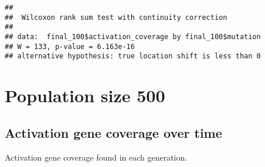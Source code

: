 \documentclass[
]{book}
\newenvironment{Shaded}{\begin{snugshade}}{\end{snugshade}}
\newcommand{\AttributeTok}[1]{\textcolor[rgb]{0.13,0.29,0.53}{#1}}
\newcommand{\ConstantTok}[1]{\textcolor[rgb]{0.56,0.35,0.01}{#1}}
\newcommand{\DecValTok}[1]{\textcolor[rgb]{0.00,0.00,0.81}{#1}}
\newcommand{\FloatTok}[1]{\textcolor[rgb]{0.00,0.00,0.81}{#1}}
\newcommand{\FunctionTok}[1]{\textcolor[rgb]{0.13,0.29,0.53}{\textbf{#1}}}
\newcommand{\NormalTok}[1]{#1}
\newcommand{\OtherTok}[1]{\textcolor[rgb]{0.56,0.35,0.01}{#1}}
\newcommand{\SpecialCharTok}[1]{\textcolor[rgb]{0.81,0.36,0.00}{\textbf{#1}}}
\newcommand{\StringTok}[1]{\textcolor[rgb]{0.31,0.60,0.02}{#1}}
\begin{document}
\begin{Shaded}
\end{Shaded}

\begin{verbatim}
## 
##  Wilcoxon rank sum test with continuity correction
## 
## data:  final_100$activation_coverage by final_100$mutation
## W = 133, p-value = 6.163e-16
## alternative hypothesis: true location shift is less than 0
\end{verbatim}

\hypertarget{population-size-500}{%
\section{Population size 500}\label{population-size-500}}

\hypertarget{activation-gene-coverage-over-time-1}{%
\subsection{Activation gene coverage over time}\label{activation-gene-coverage-over-time-1}}

Activation gene coverage found in each generation.
\end{document}
